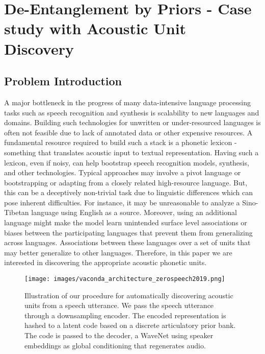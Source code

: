 \chapter{De-Entanglement by Priors - Case study with Acoustic Unit Discovery}

\section{Problem Introduction}
A major bottleneck in the progress of many data-intensive language processing tasks such as speech recognition and synthesis is scalability to new languages and domains. 
Building such technologies for unwritten or under-resourced languages is often not feasible due to lack of annotated data or other expensive resources. 
A fundamental resource required to build such a stack is a phonetic lexicon - something that translates acoustic input to textual representation. Having such a lexicon, even if noisy, can help bootstrap speech recognition models, synthesis, and other technologies. Typical approaches may involve a pivot language or bootstrapping or adapting from a closely related high-resource language.
But, this can be a deceptively non-trivial task due to linguistic differences which can pose inherent difficulties. 
For instance, it may be unreasonable to analyze a Sino-Tibetan language using English as a source. Moreover, using an additional language might make the model learn unintended surface level associations or biases between the participating languages that prevent them from generalizing across languages. Associations between these languages over a set of units that may better generalize to other languages. Therefore, in this paper we are interested in discovering the appropriate acoustic phonetic units. 

\begin{figure}[t]
\centering
\texttt{[image: images/vaconda\_architecture\_zerospeech2019.png]}
\caption{Illustration of our procedure for automatically discovering acoustic units from a speech utterance. We pass the speech utterance through a downsampling encoder. The encoded representation is hashed to a latent code based on a discrete articulatory prior bank. The code is passed to the decoder, a WaveNet using speaker embeddings as global conditioning that regenerates audio. } 
\label{frame_replacement_overview}
\end{figure}  


